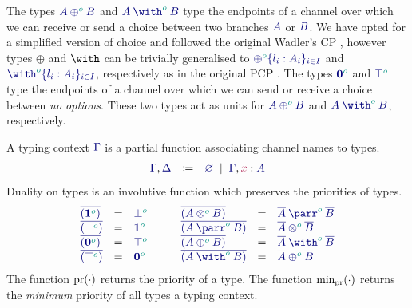 \documentclass[main.tex]{subfiles}
\begin{document}
The types $\ty{\typlus[\cs{o}]{A}{B}}$ and $\ty{\tywith[\cs{o}]{A}{B}}$ type the endpoints of a channel over which we can receive or send a choice between two branches $\ty{A}$ or $\ty{B}$. We have opted for a simplified version of choice and followed the original Wadler's CP \cite{wadler2012}, however types $\oplus$ and $\with$ can be trivially generalised to $\ty{\oplus^{\cs{o}}\{l_i:A_i\}_{i\in I}}$ and $\ty{\with^{\cs{o}}\{l_i:A_i\}_{i\in I}}$, respectively as in the original PCP \cite{dardha2018}.
The types $\ty{\tynil[\cs{o}]}$ and $\ty{\tytop[\cs{o}]}$ type the endpoints of a channel over which we can send or receive a choice between \emph{no options}. These two types act as units for $\ty{\typlus[\cs{o}]{A}{B}}$ and $\ty{\tywith[\cs{o}]{A}{B}}$, respectively.

A typing context $\ty\Gamma$ is a partial function associating channel names to types.
\[
\begin{array}{lcl}
  \ty{\Gamma}, \ty{\Delta}
  & \coloneqq & \ty{\emptyenv}
    \sep        \ty{\Gamma}, \tmty{x}{A}
\end{array}
\]
Duality on types is an involutive function which preserves the priorities of types.
\[
\begin{array}{lcl}
  \ty{\co{(\tyone[\cs{o}])}} & = & \ty{\tybot[\cs{o}]} \\
  \ty{\co{(\tybot[\cs{o}])}} & = & \ty{\tyone[\cs{o}]} \\
  \ty{\co{(\tynil[\cs{o}])}} & = & \ty{\tytop[\cs{o}]} \\
  \ty{\co{(\tytop[\cs{o}])}} & = & \ty{\tynil[\cs{o}]}
\end{array}
\qquad
\begin{array}{lcl}
  \ty{\co{(\tytens[\cs{o}]{A}{B})}} & = & \ty{\typarr[\cs{o}]{\co{A}}{\co{B}}} \\
  \ty{\co{(\typarr[\cs{o}]{A}{B})}} & = & \ty{\tytens[\cs{o}]{\co{A}}{\co{B}}} \\
  \ty{\co{(\typlus[\cs{o}]{A}{B})}} & = & \ty{\tywith[\cs{o}]{\co{A}}{\co{B}}} \\
  \ty{\co{(\tywith[\cs{o}]{A}{B})}} & = & \ty{\typlus[\cs{o}]{\co{A}}{\co{B}}}
\end{array}
\]
The function $\operatorname{pr}(\cdot)$ returns the priority of a type. The function $\text{min}_{\operatorname{pr}}(\cdot)$ returns the \emph{minimum} priority of all types a typing context.
\end{document}
